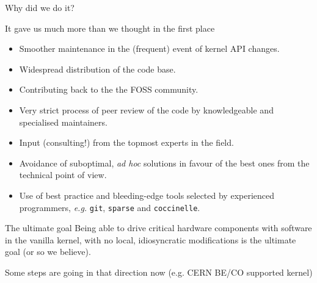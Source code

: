 \documentclass[compress,red]{beamer}
\begin{document}
\begin{frame}{Why did we do it?}

It gave us much more than we thought in the first place
\begin{itemize}
\pause
\item Smoother maintenance in the (frequent) event of kernel API
  changes.
\item Widespread distribution of the code base.
\item Contributing back to the the FOSS community.
\pause \color{red}
\item Very strict process of peer review of the code by knowledgeable
    and specialised maintainers.
\pause
\item Input (consulting!) from the topmost experts in the field.
\pause
\item Avoidance of suboptimal, \emph{ad hoc} solutions in favour of the
    best ones from the technical point of view.
\pause
\item Use of best practice and bleeding-edge tools selected by
    experienced programmers, \emph{e.g.} \texttt{git}, \texttt{sparse}
    and \texttt{coccinelle}.
\end{itemize}
\end{frame}

\begin{frame}{The ultimate goal}
    Being able to drive critical hardware components with software
    in the vanilla kernel, with no local, idiosyncratic modifications
    is the ultimate goal (or so we believe).

    Some steps are going in that direction now (e.g. CERN BE/CO
    supported kernel)
\end{frame}
\end{document}
